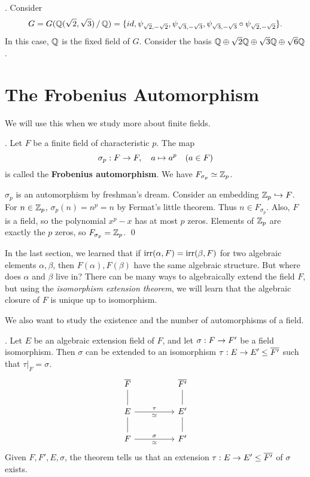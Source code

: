 \ex. Consider
\[
    G = G(\mathbb{Q}(\sqrt{2}, \sqrt{3}) \operatorname{/} \mathbb{Q}) = \{id, \psi_{\sqrt{2}, -\sqrt{2}}, \psi_{\sqrt{3}, -\sqrt{3}}, \psi_{\sqrt{3}, -\sqrt{3}} \circ \psi_{\sqrt{2}, -\sqrt{2}}\}.
\]
In this case, \(\mathbb{Q}\) is the fixed field of \(G\). Consider the basis \(\mathbb{Q} \oplus \sqrt{2} \mathbb{Q} \oplus \sqrt{3} \mathbb{Q} \oplus \sqrt{6}\mathbb{Q}\).

\section*{The Frobenius Automorphism}

We will use this when we study more about finite fields.

\thm.  Let \(F\) be a finite field of characteristic \(p\). The map
\[
    \sigma_p : F \rightarrow F, \quad a \mapsto a^p \quad (a \in F)
\]
is called the \textbf{Frobenius automorphism}. We have \(F_{\sigma_p} \simeq \mathbb{Z}_p\).

\pf \(\sigma_p\) is an automorphism by freshman's dream. Consider an embedding \(\mathbb{Z}_p \hookrightarrow F\). For \(n \in \mathbb{Z}_p\), \(\sigma_p(n) = n^p = n\) by Fermat's little theorem. Thus \(n \in F_{\sigma_p}\). Also, \(F\) is a field, so the polynomial \(x^p - x\) has at most \(p\) zeros. Elements of \(\mathbb{Z}_p\) are exactly the \(p\) zeros, so \(F_{\sigma_p} = \mathbb{Z}_p\). \qed


In the last section, we learned that if \(\mathrm{irr}(\alpha, F) = \mathrm{irr}(\beta, F)\) for two algebraic elements \(\alpha, \beta\), then \(F(\alpha), F(\beta)\) have the same algebraic structure. But where does \(\alpha\) and \(\beta\) live in? There can be many ways to algebraically extend the field \(F\), but using the \textit{isomorphism extension theorem}, we will learn that the algebraic closure of \(F\) is unique up to isomorphism.

We also want to study the existence and the number of automorphisms of a field.

\thm.  Let \(E\) be an algebraic extension field of \(F\), and let \(\sigma : F \rightarrow F'\) be a field isomorphism. Then \(\sigma\) can be extended to an isomorphism \(\tau : E \ra E' \leq \bar{F'}\) such that \(\tau|_F = \sigma\).
\[
    \begin{tikzcd}
        \bar{F} \arrow[dash]{d} & &\bar{F'} \arrow[dash]{d} \\
        E \arrow[dash]{d} \arrow{rr}{\tau}[swap]{\simeq} & & E' \arrow[dash]{d} \\
        F \arrow{rr}{\sigma}[swap]{\simeq} & & F'
    \end{tikzcd}
\]
Given \(F, F', E, \sigma\), the theorem tells us that an extension \(\tau : E \ra E' \leq \bar{F'}\) of \(\sigma\) exists.


